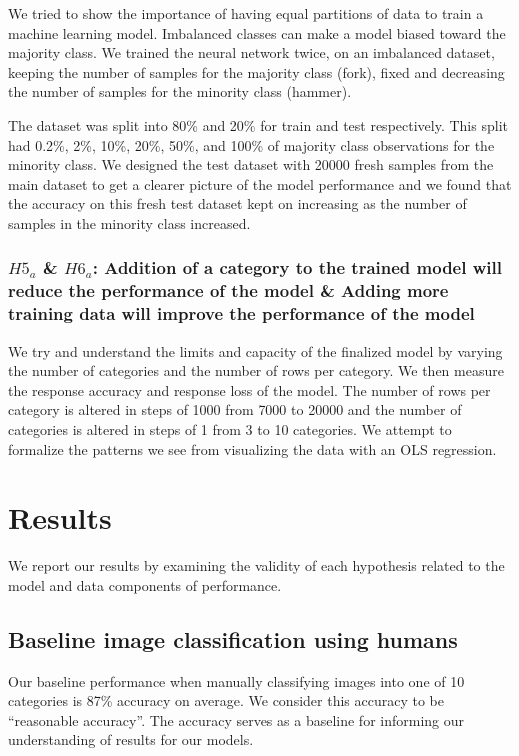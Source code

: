 \documentclass[11pt]{article}
\begin{document}
We tried to show the importance of having equal partitions of data to train
a machine learning model. Imbalanced classes can make a model biased toward
the majority class. We trained the neural network twice, on an imbalanced
dataset, keeping the number of samples for the majority class (fork), fixed
and decreasing the number of samples for the minority class (hammer).

The dataset was split into 80\% and 20\% for train and test respectively.
This split had 0.2\%, 2\%, 10\%, 20\%, 50\%, and 100\% of majority class
observations for the minority class. We designed the test dataset with 20000
fresh samples from the main dataset to get a clearer picture of the model
performance and we found that the accuracy on this fresh test dataset kept
on increasing as the number of samples in the minority class increased.

\subsubsection{$H5_a$ \& $H6_a$: Addition of a category to the trained model will reduce the performance of the model \& Adding more training data will improve the performance of the model}

We try and understand the limits and capacity of the finalized model by
varying the number of categories and the number of rows per category. We
then measure the response accuracy and response loss of the model. The
number of rows per category is altered in steps of 1000 from 7000 to
20000 and the number of categories is altered in steps of 1 from 3 to 10
categories. We attempt to formalize the patterns we see from visualizing
the data with an OLS regression.

\section{Results}

We report our results by examining the validity of each hypothesis
related to the model and data components of performance.

\subsection{Baseline image classification using humans}

Our baseline performance when manually classifying images into one
of 10 categories is 87\% accuracy on average. We consider this accuracy to
be ``reasonable accuracy''. The accuracy serves as a baseline for informing
our understanding of results for our models.
\end{document}
